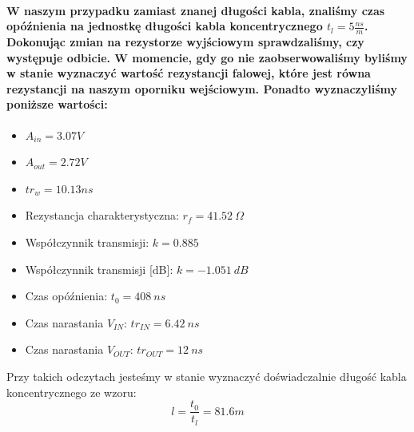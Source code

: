 \documentclass[a4paper,12pt]{article}
\begin{document}
\begin{justify}
\paragraph{W naszym przypadku zamiast znanej długości kabla, znaliśmy czas opóźnienia na jednostkę długości kabla koncentrycznego $t_{l} = 5 \frac{ns}{m}$. Dokonując zmian na rezystorze wyjściowym sprawdzaliśmy, czy występuje odbicie. W momencie, gdy go nie zaobserwowaliśmy byliśmy w stanie wyznaczyć wartość rezystancji falowej, które jest równa rezystancji na naszym oporniku wejściowym. Ponadto wyznaczyliśmy poniższe wartości: }

\begin{itemize}
\item $A_{in} = 3.07V$
\item $A_{out} = 2.72V$
\item $tr_{w} = 10.13ns$
\item Rezystancja charakterystyczna:  $r_{f} = \SI{41.52}{\Omega}$
\item Współczynnik transmisji: $k = 0.885$
\item Współczynnik transmisji [dB]: $k = \SI{-1.051}{dB}$
\item Czas opóźnienia: $t_{0} = \SI{408}{ns}$
\item Czas narastania $V_{IN}$: $tr_{IN} = \SI{6.42}{ns}$
\item Czas narastania $V_{OUT}$: $tr_{OUT} =\SI{12}{ns} $
\end{itemize}

Przy takich odczytach jesteśmy w stanie wyznaczyć doświadczalnie długość kabla koncentrycznego ze wzoru:
\begin{equation}
l = \frac{t_{0}}{t_{l}} = 81.6m
\end{equation}

\end{justify}
\end{document}
